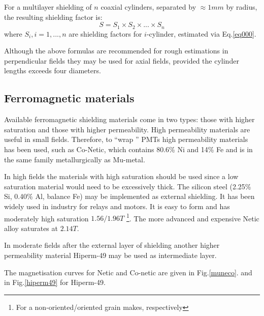 \documentclass[12pt]{article}
\begin{document}
For a multilayer shielding of $n$ coaxial cylinders, separated by $\approx 1mm$ by radius,
the resulting shielding factor is:
%
\begin{equation}
S=S_1 \times S_2 \times...\times S_n
\label{eq777}
\end{equation}
%
where $S_i,i=1,...,n$ are shielding factors for
$i$-cylinder,  estimated via Eq.\ref{eq000}.

Although the above formulas are recommended  for rough estimations
in perpendicular fields they may be used for axial fields, provided the
cylinder lengths exceeds  four  diameters.





\subsection{Ferromagnetic materials}
Available ferromagnetic shielding materials come in two types: those with higher saturation and
those with higher permeability.
High permeability materials are useful  in small  fields.
Therefore, to ``wrap '' PMTs  high permeability materials has been  used, such as  Co-Netic,
which contains 80.6\% Ni and 14\% Fe and is in the same family metallurgically as Mu-metal. 
 
In high fields  the  materials with high saturation should be used
since a low saturation material would need to be excessively thick.
The   silicon steel (2.25\% Si, 0.40\% Al, balance Fe) may be implemented as 
external shielding. It has been  widely used  in  industry for relays and motors.
It  is easy to form and  has moderately high saturation  $1.56/1.96T$
\footnote{For a  non-oriented/oriented grain makes, respectively}.
The more advanced and expensive  Netic alloy saturates at $2.14T$.

In  moderate fields after the external layer of shielding another  higher permeability material 
Hiperm-49 may be used as intermediate layer.

The magnetisation curves for Netic and Co-netic are given in Fig.\ref{muneco}.
and  in Fig.\ref{hiperm49} for Hiperm-49.


\end{document}
